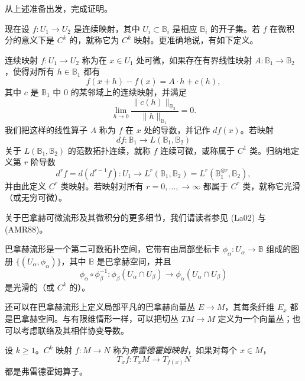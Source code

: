 \begin{exercise}\label{ex:fredholm-index-continuity}
从上述准备出发，完成证明。
\end{exercise}

现在设 $f:U_1\to U_2$ 是连续映射，其中 $U_i\subset\mathbb B_i$ 是相应 $\mathbb B_i$ 的开子集。若 $f$ 在微积分的意义下是 $C^k$ 的，就称它为 $C^k$ 映射。更准确地说，有如下定义。

\begin{definition}\label{def:differentiability-banach-spaces}
连续映射 $f:U_1\to U_2$ 称为在 $x\in U_1$ 处可微，如果存在有界线性映射
$A:\mathbb B_1\to\mathbb B_2$，使得对所有 $h\in\mathbb B_1$ 都有
\[
 f(x+h)-f(x)=A\cdot h+c(h),
\]
其中 $c$ 是 $\mathbb B_1$ 中 $0$ 的某邻域上的连续映射，并满足
\[
 \lim_{h\to0}\frac{\lVert c(h)\rVert_{\mathbb B_2}}
 {\lVert h\rVert_{\mathbb B_1}}=0.
\]
我们把这样的线性算子 $A$ 称为 $f$ 在 $x$ 处的导数，并记作 $df(x)$。若映射
\[
 df:\mathbb B_1\to L(\mathbb B_1,\mathbb B_2)
\]
关于 $L(\mathbb B_1,\mathbb B_2)$ 的范数拓扑连续，就称 $f$ 连续可微，或称属于 $C^1$ 类。归纳地定义第 $r$ 阶导数
\[
 d^rf=d(d^{r-1}f):U_1\to
 L^r(\mathbb B_1,\mathbb B_2)
 =L^r(\mathbb B_1^{\otimes r},\mathbb B_2),
\]
并由此定义 $C^r$ 类映射。若映射对所有 $r=0,\ldots,\to\infty$ 都属于 $C^r$ 类，就称它光滑（或无穷可微）。
\end{definition}

关于巴拿赫可微流形及其微积分的更多细节，我们请读者参见 (La02) 与 (AMR88)。

\begin{definition}\label{def:banach-manifold}
巴拿赫流形是一个第二可数拓扑空间，它带有由局部坐标卡
$\phi_\alpha:U_\alpha\to\mathbb B$ 组成的图册
$\{(U_\alpha,\phi_\alpha)\}$，其中 $\mathbb B$ 是巴拿赫空间，并且
\[
 \phi_\alpha\circ\phi_\beta^{-1}:
 \phi_\beta(U_\alpha\cap U_\beta)
 \longrightarrow
 \phi_\alpha(U_\alpha\cap U_\beta)
\]
是光滑的（或 $C^k$ 的）。
\end{definition}

还可以在巴拿赫流形上定义局部平凡的巴拿赫向量丛
$E\to M$，其每条纤维 $E_x$ 都是巴拿赫空间。与有限维情形一样，可以把切丛 $TM\to M$ 定义为一个向量丛；也可以考虑联络及其相伴协变导数。

\begin{definition}\label{def:fredholm-map}
设 $k\geq1$。$C^k$ 映射 $f:M\to N$ 称为\emph{弗雷德霍姆映射}，如果对每个 $x\in M$，
\[
 T_xf:T_xM\to T_{f(x)}N
\]
都是弗雷德霍姆算子。
\end{definition}

